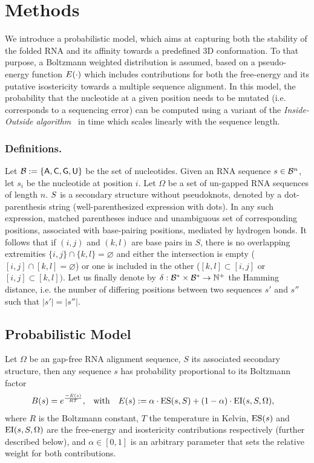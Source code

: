 
\section{Methods}
\label{sec:methods}

We introduce a probabilistic model, which aims at capturing both the stability of the folded RNA and its affinity towards a predefined 3D conformation.
To that purpose, a Boltzmann weighted distribution is assumed, based on a pseudo-energy function $E(\cdot)$ which includes contributions for both the free-energy and its putative isostericity towards a multiple sequence alignment. In this model, the probability that the nucleotide at a given position needs to be mutated (i.e. corresponds to a sequencing error) can be computed using a variant of the \emph{Inside-Outside algorithm}~\citep{Lari1990} in time which scales linearly with the sequence length.


\subsubsection{Definitions.}
Let $\mathcal{B}:=\left\{{\sf{A}},{\sf{C}},{\sf{G}},{\sf{U}}\right\}$ be the set of nucleotides.
Given an RNA sequence $s\in \mathcal{B}^n$, let $s_i$ be the nucleotide at position $i$. Let $\Omega$ be a set of un-gapped RNA sequences of
length $n$. $S$ is a secondary structure without pseudoknots, denoted by a dot-parenthesis string (well-parenthesized expression with dots). In any such expression, matched parentheses induce and unambiguous set of corresponding positions, associated with base-pairing positions, mediated by hydrogen bonds. It follows that if $(i,j)$ and $(k,l)$ are base pairs in $S$, there is no overlapping extremities  $\{i,j\}\cap \{k,l\}=\varnothing$ and either the intersection is empty 
 ($[i,j]\cap[k,l]=\varnothing$) or one is included in the other ($[k,l]\subset[i,j]$ or 
 $[i,j]\subset[k,l])$. Let us finally denote by $\delta: \mathcal{B}^*\times \mathcal{B}^* \to \mathbb{N}^+$ the Hamming distance, i.e. the number of differing positions between two sequences $s'$ and $s''$ such that $|s'|=|s''|$.




\subsection{Probabilistic Model}\label{sec:model}
Let $\Omega$ be an gap-free RNA alignment sequence, $S$ its associated secondary structure, 
then any sequence $s$ has probability proportional to its Boltzmann factor
\begin{align*}
  {B}(s) &= e^\frac{-E(s)}{RT}, &&\text{with}&E(s)&:=\alpha\cdot\text{ES}(s,S)+(1-\alpha)\cdot\text{EI}(s,S,\Omega),
\end{align*}
where $R$ is the Boltzmann constant, $T$ the temperature in Kelvin, $\text{ES}(s)$ and $\text{EI}(s,S,\Omega)$ 
are the free-energy and isostericity contributions respectively (further described below), and $\alpha\in[0,1]$ is an arbitrary parameter that sets the relative weight for both contributions.

